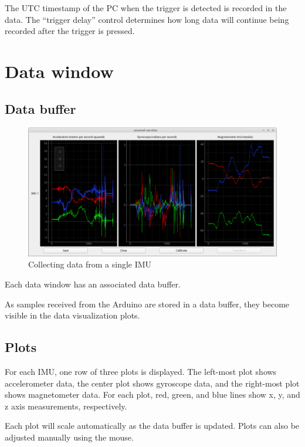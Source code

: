 \documentclass[11pt,letterpaper,article,oneside]{memoir}
\begin{document}
The UTC timestamp of the PC when the trigger is detected is recorded in the
data. The ``trigger delay'' control determines how long data will continue being
recorded after the trigger is pressed.





\chapter{Data window}

\section{Data buffer}

\begin{figure}[]
    \begin{center}
        \includegraphics[width=\textwidth]{data_window}
    \end{center}
    \caption{Collecting data from a single IMU} 
\end{figure}

Each data window has an associated data buffer.

As samples received from the Arduino are stored in a data buffer, they
become visible in the data visualization plots.

\section{Plots}

For each IMU, one row of three
plots is displayed. The left-most plot shows accelerometer data, the center plot
shows gyroscope data, and the right-most plot shows magnetometer data. For each
plot, red, green, and blue lines show x, y, and z axis measurements,
respectively.


Each plot will scale automatically as the data buffer is updated. Plots can also
be adjusted manually using the mouse.
\end{document}

